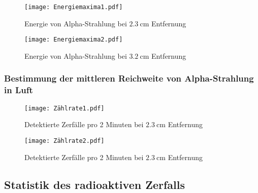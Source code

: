\begin{figure}[H]
  \centering
  \texttt{[image: Energiemaxima1.pdf]}
  \caption{Energie von Alpha-Strahlung bei $\qty{2.3}{\centi\meter}$ Entfernung}
  \label{fig:Energie1}
\end{figure}

\begin{figure}[H]
  \centering
  \texttt{[image: Energiemaxima2.pdf]}
  \caption{Energie von Alpha-Strahlung bei $\qty{3.2}{\centi\meter}$ Entfernung}
  \label{fig:Energie2}
\end{figure}

\subsubsection{Bestimmung der mittleren Reichweite von Alpha-Strahlung in Luft}

\begin{figure}[H]
  \centering
  \texttt{[image: Zählrate1.pdf]}
  \caption{Detektierte Zerfälle pro 2 Minuten bei $\qty{2.3}{\centi\meter}$ Entfernung}
  \label{fig:Energie1}
\end{figure}

\begin{figure}[H]
  \centering
  \texttt{[image: Zählrate2.pdf]}
  \caption{Detektierte Zerfälle pro 2 Minuten bei $\qty{2.3}{\centi\meter}$ Entfernung}
  \label{fig:Energie1}
\end{figure}

\subsection{Statistik des radioaktiven Zerfalls}

